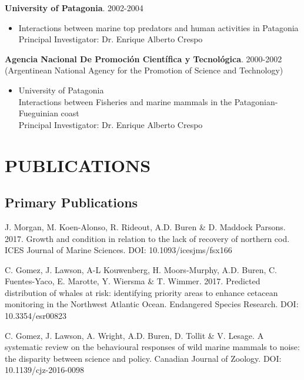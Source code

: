 \documentclass{res}
\begin{document}
\begin{resume}
\textbf{University of Patagonia}. 2002-2004
\begin{itemize} %
	\item[] Interactions between marine top predators and human activities in Patagonia\\
Principal Investigator: Dr. Enrique Alberto Crespo
\end{itemize}

\textbf{Agencia Nacional De Promoci\'{o}n Cient\'{i}fica y Tecnol\'{o}gica}. 2000-2002\\
(Argentinean National Agency for the Promotion of Science and Technology)
\begin{itemize} %
	\item[] University of Patagonia\\
Interactions between Fisheries and marine mammals in the Patagonian-Fueguinian coast\\
Principal Investigator: Dr. Enrique Alberto Crespo
\end{itemize}

\newpage
\section{PUBLICATIONS} 
\subsection{Primary Publications}
\begin{hangparas}{.4in}{1}

J. Morgan, M. Koen-Alonso, R. Rideout, A.D. Buren \& D. Maddock Parsons. 2017. Growth and condition in relation to the lack of recovery of northern cod. ICES Journal of Marine Sciences. DOI: 10.1093/icesjms/fsx166

C. Gomez,  J. Lawson, A-L Kouwenberg, H. Moors-Murphy, A.D. Buren, C. Fuentes-Yaco, E.  Marotte, Y. Wiersma \& T. Wimmer. 2017. Predicted distribution of whales at risk: identifying priority areas to enhance cetacean monitoring in the Northwest Atlantic Ocean. Endangered Species Research. DOI: 10.3354/esr00823

C. Gomez, J. Lawson, A. Wright, A.D. Buren, D. Tollit \& V. Lesage. A systematic review on the behavioural responses of wild marine mammals to noise: the disparity between science and policy. Canadian Journal of Zoology. DOI: 10.1139/cjz-2016-0098


\end{hangparas}
\end{resume}
\end{document}
